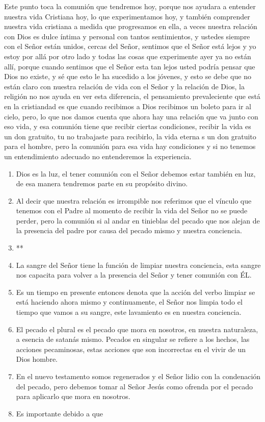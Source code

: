 \documentclass[12pt]{article}
\begin{document}
Este punto toca la comunión que tendremos hoy, porque nos ayudara a entender nuestra vida Cristiana hoy, lo que experimentamos hoy, y también comprender nuestra vida cristiana a medida que progresamos en ella, a veces nuestra relación con Dios es dulce íntima y personal con tantos sentimientos, y ustedes siempre con el Señor están unidos, cercas del Señor, sentimos que el Señor está lejos y yo estoy por allá por otro lado y todas las cosas que experimente ayer ya no están allí, porque cuando sentimos que el Señor esta tan lejos usted podría pensar que Dios no existe, y sé que esto le ha sucedido a los jóvenes, y esto se debe que no están claro con nuestra relación de vida con el Señor y la relación de Dios, la religión no nos ayuda en ver esta diferencia, el pensamiento prevaleciente que está en la cristiandad es que cuando recibimos a Dios recibimos un boleto para ir al cielo, pero, lo que nos damos cuenta que ahora hay una relación que va junto con eso vida, y esa comunión tiene que recibir ciertas condiciones, recibir la vida es un don gratuito, tu no trabajaste para recibirlo, la vida eterna s un don gratuito para el hombre, pero la comunión para esa vida hay condiciones y si no tenemos un entendimiento adecuado no entenderemos la experiencia.\\

\begin{enumerate}

\item Dios es la luz, el tener comunión con el Señor debemos estar también en luz, de esa manera tendremos parte en su propósito divino.
\item Al decir que nuestra relación es irrompible nos referimos que el vínculo que tenemos con el Padre al momento de recibir la vida del Señor no se puede perder, pero la comunión si al andar en tinieblas del pecado que nos alejan de la presencia del padre por causa del pecado mismo y nuestra conciencia.
\item **
\item La sangre del Señor tiene la función de limpiar nuestra conciencia, esta sangre nos capacita para volver a la presencia del Señor y tener comunión con ÉL.
\item Es un tiempo en presente entonces denota que la acción del verbo limpiar se está haciendo ahora mismo y continuamente, el Señor nos limpia todo el tiempo que vamos a su sangre, este lavamiento es en nuestra conciencia.
\item El pecado el plural es el pecado que mora en nosotros, en nuestra naturaleza, a esencia de satanás mismo. Pecados en singular se refiere a los hechos, las acciones pecaminosas, estas acciones que son incorrectas en el vivir de un Dios hombre. 
\item En el nuevo testamento somos regenerados y el Señor lidio con la condenación del pecado, pero debemos tomar al Señor Jesús como ofrenda por el pecado para aplicarlo que mora en nosotros.
\item Es importante debido a que

\end{enumerate}
\end{document}
